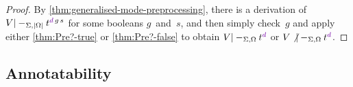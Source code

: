 \begin{proof}
By \cref{thm:generalised-mode-preprocessing}, there is a derivation of $V |-_{\Sigma,\erase\Omega} t^{\dir{d}\,g\,s}$ for some booleans $g$~and~$s$, and then simply check~$g$ and apply either \cref{thm:Pre?-true} or \cref{thm:Pre?-false} to obtain $V |-_{\Sigma,\Omega} t^\dir{d}$ or $V \not|-_{\Sigma,\Omega} t^\dir{d}$.
\end{proof}

%
%
%
%
%

\subsection{Annotatability}
\label{sec:annotatability}

